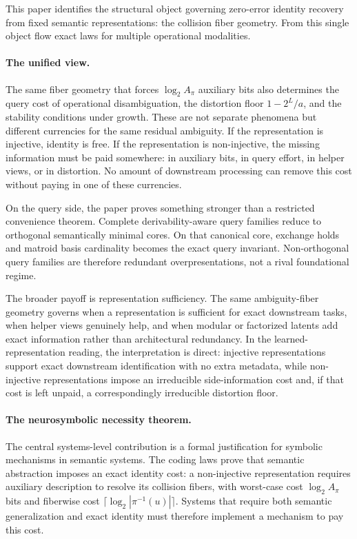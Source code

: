 This paper identifies the structural object governing zero-error identity recovery from fixed semantic representations: the collision fiber geometry. From this single object flow exact laws for multiple operational modalities.

\paragraph{The unified view.}
The same fiber geometry that forces $\log_2 A_\pi$ auxiliary bits also determines the query cost of operational disambiguation, the distortion floor $1-2^L/a$, and the stability conditions under growth. These are not separate phenomena but different currencies for the same residual ambiguity. If the representation is injective, identity is free. If the representation is non-injective, the missing information must be paid somewhere: in auxiliary bits, in query effort, in helper views, or in distortion. No amount of downstream processing can remove this cost without paying in one of these currencies.

On the query side, the paper proves something stronger than a restricted convenience theorem. Complete derivability-aware query families reduce to orthogonal semantically minimal cores. On that canonical core, exchange holds and matroid basis cardinality becomes the exact query invariant. Non-orthogonal query families are therefore redundant overpresentations, not a rival foundational regime.

The broader payoff is representation sufficiency. The same ambiguity-fiber geometry governs when a representation is sufficient for exact downstream tasks, when helper views genuinely help, and when modular or factorized latents add exact information rather than architectural redundancy. In the learned-representation reading, the interpretation is direct: injective representations support exact downstream identification with no extra metadata, while non-injective representations impose an irreducible side-information cost and, if that cost is left unpaid, a correspondingly irreducible distortion floor.

\paragraph{The neurosymbolic necessity theorem.}
The central systems-level contribution is a formal justification for symbolic mechanisms in semantic systems. The coding laws prove that semantic abstraction imposes an exact identity cost: a non-injective representation requires auxiliary description to resolve its collision fibers, with worst-case cost $\log_2 A_\pi$ bits and fiberwise cost $\lceil \log_2 |\pi^{-1}(u)| \rceil$. Systems that require both semantic generalization and exact identity must therefore implement a mechanism to pay this cost.

